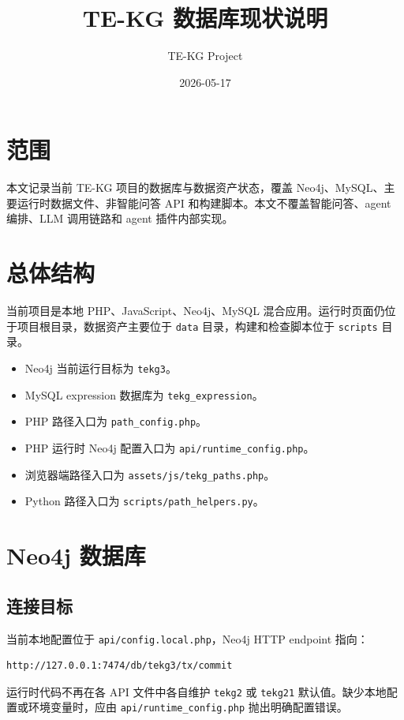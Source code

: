 \documentclass[UTF8]{ctexart}
\title{TE-KG 数据库现状说明}
\author{TE-KG Project}
\date{2026-05-17}
\begin{document}
\maketitle

\section{范围}

本文记录当前 TE-KG 项目的数据库与数据资产状态，覆盖 Neo4j、MySQL、主要运行时数据文件、非智能问答 API 和构建脚本。本文不覆盖智能问答、agent 编排、LLM 调用链路和 agent 插件内部实现。

\section{总体结构}

当前项目是本地 PHP、JavaScript、Neo4j、MySQL 混合应用。运行时页面仍位于项目根目录，数据资产主要位于 \verb|data| 目录，构建和检查脚本位于 \verb|scripts| 目录。

\begin{itemize}
  \item Neo4j 当前运行目标为 \texttt{tekg3}。
  \item MySQL expression 数据库为 \texttt{tekg\_expression}。
  \item PHP 路径入口为 \verb|path_config.php|。
  \item PHP 运行时 Neo4j 配置入口为 \verb|api/runtime_config.php|。
  \item 浏览器端路径入口为 \verb|assets/js/tekg_paths.php|。
  \item Python 路径入口为 \verb|scripts/path_helpers.py|。
\end{itemize}

\section{Neo4j 数据库}

\subsection{连接目标}

当前本地配置位于 \verb|api/config.local.php|，Neo4j HTTP endpoint 指向：

\begin{verbatim}
http://127.0.0.1:7474/db/tekg3/tx/commit
\end{verbatim}

运行时代码不再在各 API 文件中各自维护 \texttt{tekg2} 或 \texttt{tekg21} 默认值。缺少本地配置或环境变量时，应由 \verb|api/runtime_config.php| 抛出明确配置错误。
\end{document}

